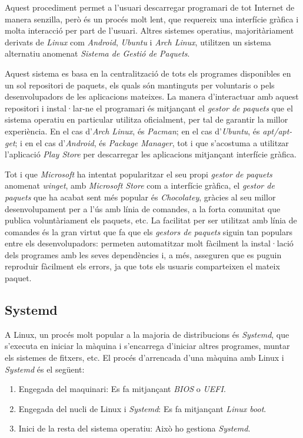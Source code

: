 Aquest procediment permet a l'usuari descarregar programari de tot Internet de manera senzilla, però és un procés molt lent, que requereix una interfície gràfica i molta interacció per part de l'usuari. Altres sistemes operatius, majoritàriament derivats de \textit{Linux} com \textit{Android}, \textit{Ubuntu} i \textit{Arch Linux}, utilitzen un sistema alternatiu anomenat \textit{Sistema de Gestió de Paquets}.

Aquest sistema es basa en la centralització de tots els programes disponibles en un sol repositori de paquets, els quals són mantinguts per voluntaris o pels desenvolupadors de les aplicacions mateixes. La manera d'interactuar amb aquest repositori i instal·lar-ne el programari és mitjançant el \textit{gestor de paquets} que el sistema operatiu en particular utilitza oficialment, per tal de garantir la millor experiència. En el cas d'\textit{Arch Linux}, és \textit{Pacman}; en el cas d'\textit{Ubuntu}, és \textit{apt/apt-get}; i en el cas d'\textit{Android}, és \textit{Package Manager}, tot i que s'acostuma a utilitzar l'aplicació \textit{Play Store} per descarregar les aplicacions mitjançant interfície gràfica.

Tot i que \textit{Microsoft} ha intentat popularitzar el seu propi \textit{gestor de paquets} anomenat \textit{winget}, amb \textit{Microsoft Store} com a interfície gràfica, el \textit{gestor de paquets} que ha acabat sent més popular és \textit{Chocolatey}, gràcies al seu millor desenvolupament per a l'ús amb línia de comandes, a la forta comunitat que publica voluntàriament els paquets, etc. La facilitat per ser utilitzat amb línia de comandes és la gran virtut que fa que els \textit{gestors de paquets} siguin tan populars entre els desenvolupadors: permeten automatitzar molt fàcilment la instal·lació dels programes amb les seves dependències i, a més, asseguren que es puguin reproduir fàcilment els errors, ja que tots els usuaris comparteixen el mateix paquet.\cite{spinellis_package_2012}

\subsection{Systemd}
A Linux, un procés molt popular a la majoria de distribucions és \textit{Systemd}, que s'executa en iniciar la màquina i s'encarrega d'iniciar altres programes, muntar els sistemes de fitxers, etc. El procés d'arrencada d'una màquina amb Linux i \textit{Systemd} és el següent\cite{both_systemd_2024}:

\begin{enumerate} \item Engegada del maquinari: Es fa mitjançant \textit{BIOS} o \textit{UEFI}. \item Engegada del nucli de Linux i \textit{Systemd}: Es fa mitjançant \textit{Linux boot}. \item Inici de la resta del sistema operatiu: Això ho gestiona \textit{Systemd}. \end{enumerate}

